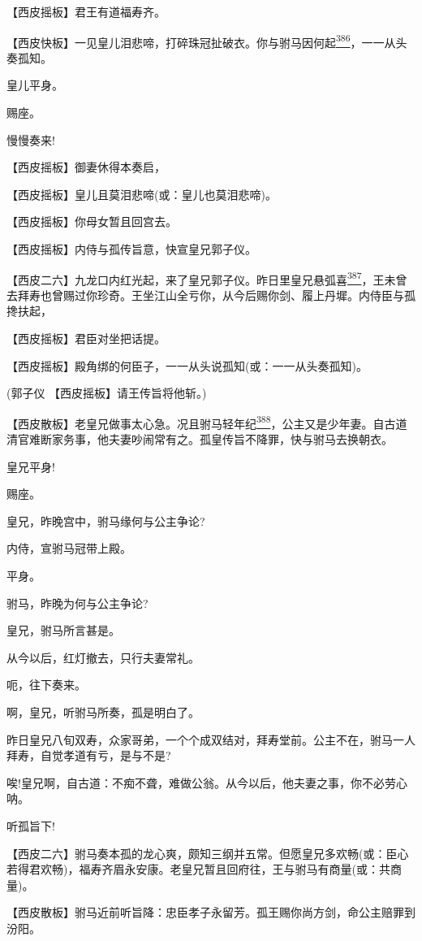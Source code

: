 【西皮摇板】君王有道福寿齐。

【西皮快板】一见皇儿泪悲啼，打碎珠冠扯破衣。你与驸马因何起\protect\hyperlink{fn386}{\textsuperscript{386}}，一一从头奏孤知。

皇儿平身。

赐座。

慢慢奏来!

【西皮摇板】御妻休得本奏启，

【西皮摇板】皇儿且莫泪悲啼(或：皇儿也莫泪悲啼)。

【西皮摇板】你母女暂且回宫去。

【西皮摇板】内侍与孤传旨意，快宣皇兄郭子仪。

【西皮二六】九龙口内红光起，来了皇兄郭子仪。昨日里皇兄悬弧喜\protect\hyperlink{fn387}{\textsuperscript{387}}，王未曾去拜寿也曾赐过你珍奇。王坐江山全亏你，从今后赐你剑、履上丹墀。内侍臣与孤搀扶起，

【西皮摇板】君臣对坐把话提。

【西皮摇板】殿角绑的何臣子，一一从头说孤知(或：一一从头奏孤知)。

(郭子仪 【西皮摇板】请王传旨将他斩。)

【西皮散板】老皇兄做事太心急。况且驸马轻年纪\protect\hyperlink{fn388}{\textsuperscript{388}}，公主又是少年妻。自古道清官难断家务事，他夫妻吵闹常有之。孤皇传旨不降罪，快与驸马去换朝衣。

皇兄平身!

赐座。

皇兄，昨晚宫中，驸马缘何与公主争论?

内侍，宣驸马冠带上殿。

平身。

驸马，昨晚为何与公主争论?

皇兄，驸马所言甚是。

从今以后，红灯撤去，只行夫妻常礼。

呃，往下奏来。

啊，皇兄，听驸马所奏，孤是明白了。

昨日皇兄八旬双寿，众家哥弟，一个个成双结对，拜寿堂前。公主不在，驸马一人拜寿，自觉孝道有亏，是与不是?

唉!皇兄啊，自古道：不痴不聋，难做公翁。从今以后，他夫妻之事，你不必劳心呐。

听孤旨下!

【西皮二六】驸马奏本孤的龙心爽，颇知三纲并五常。但愿皇兄多欢畅(或：臣心若得君欢畅)，福寿齐眉永安康。老皇兄暂且回府往，王与驸马有商量(或：共商量)。

【西皮散板】驸马近前听旨降：忠臣孝子永留芳。孤王赐你尚方剑，命公主赔罪到汾阳。

